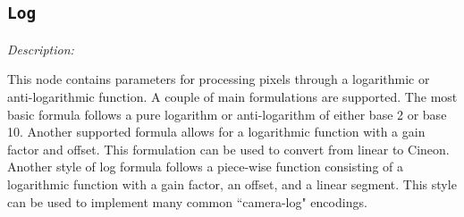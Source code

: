\subsection{\texttt{Log}}

\def\var#1{\text{\emph{#1}}}

\emph{Description:} \par
This node contains parameters for processing pixels through a logarithmic or anti-logarithmic function. A couple of main formulations are supported. The most basic formula follows a pure logarithm or anti-logarithm of either base 2 or base 10. Another supported formula allows for a logarithmic function with a gain factor and offset. This formulation can be used to convert from linear to Cineon. Another style of log formula follows a piece-wise function consisting of a logarithmic function with a gain factor, an offset, and a linear segment. This style can be used to implement many common ``camera-log" encodings.




